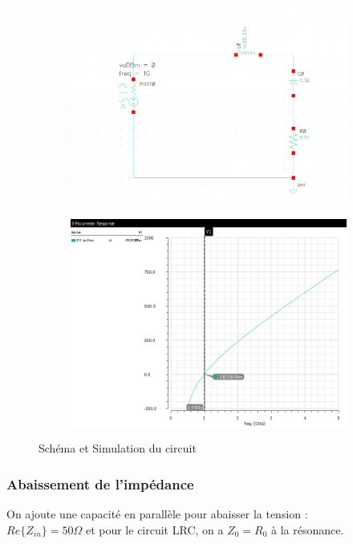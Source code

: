 \documentclass[a4paper]{article}
\begin{document}
\begin{figure}[!htb]
  \begin{subfigure}[t]{.5\linewidth}
      \centering
      \includegraphics[width=1.1\linewidth]{circuit-LRC.png}
      \label{fig:rccircuit}
  \end{subfigure}%
  \begin{subfigure}[t]{.5\linewidth}
    \centering
    \includegraphics[width=1\linewidth]{sim-LRC.png}
    \label{fig:rccircuit-sim}
  \end{subfigure}%
  \caption{Sch\'ema et Simulation du circuit}
  \label{fig:RC-sim}
\end{figure}

\subsubsection{Abaissement de l'imp\'edance}
On ajoute une capacit\'e en parall\`ele pour abaisser la tension : \\
$Re\{Z_{in}\} = 50 \Omega$ et pour le circuit LRC, on a $Z_0 = R_0$ \`a la r\'esonance.
\end{document}
